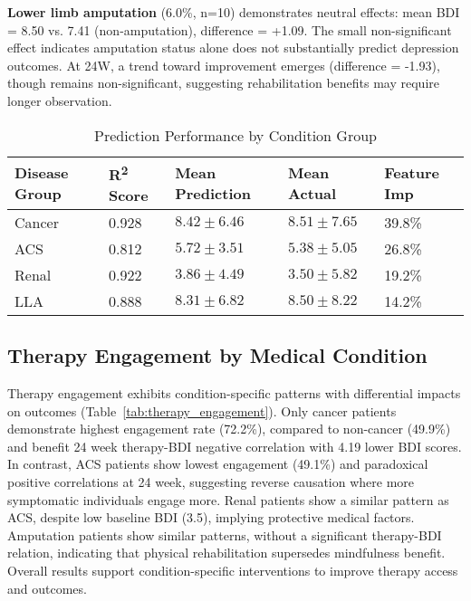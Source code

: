 \documentclass[conference]{IEEEtran}
\begin{document}
\textbf{Lower limb amputation} (6.0\%, n=10) demonstrates neutral effects: mean BDI = 8.50 vs. 7.41 (non-amputation), difference = +1.09. The small non-significant effect indicates amputation status alone does not substantially predict depression outcomes. At 24W, a trend toward improvement emerges (difference = -1.93), though remains non-significant, suggesting rehabilitation benefits may require longer observation.


\begin{table}
\centering
\caption{Prediction Performance by Condition Group}
\label{tab:condition_performance}
\begin{tabularx}{\linewidth}{XXXXX}
\hline
\textbf{Disease Group} & \textbf{R\textsuperscript{2} Score} & \textbf{Mean Prediction} & \textbf{Mean Actual} & \textbf{Feature Imp}\\
\midrule
Cancer & 0.928 & $8.42\pm6.46$ & $8.51\pm7.65$ & 39.8\%  \\
ACS & 0.812 & $5.72\pm3.51$ & $5.38\pm5.05$ & 26.8\% \\
Renal & 0.922 & $3.86\pm4.49$ & $3.50\pm5.82$ & 19.2\% \\
LLA & 0.888 & $8.31\pm6.82$ & $8.50\pm8.22$ & 14.2\% \\
\bottomrule
\end{tabularx}
\end{table}

\subsection{Therapy Engagement by Medical Condition}

Therapy engagement exhibits condition-specific patterns with differential impacts on outcomes (Table~\ref{tab:therapy_engagement}). Only cancer patients demonstrate highest engagement rate (72.2\%), compared to non-cancer (49.9\%) and benefit 24 week therapy-BDI negative correlation with 4.19 lower BDI scores. In contrast, ACS patients show lowest engagement (49.1\%) and paradoxical positive correlations at 24 week, suggesting reverse causation where more symptomatic individuals engage more. Renal patients show a similar pattern as ACS, despite low baseline BDI (3.5), implying protective medical factors. Amputation patients show similar patterns, without a significant therapy-BDI relation, indicating that physical rehabilitation supersedes mindfulness benefit. Overall results support condition-specific interventions to improve therapy access and outcomes.
\end{document}
